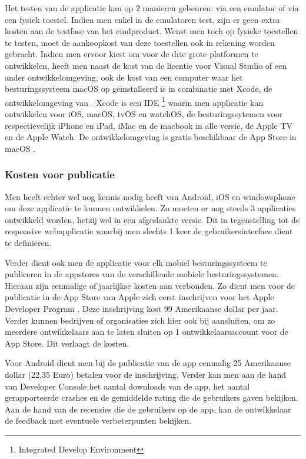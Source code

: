 Het testen van de applicatie kan op 2 manieren gebeuren: via een emulator of via een fysiek toestel. Indien men enkel in de emulatoren test, zijn er geen extra kosten aan de testfase van het eindproduct.
Wenst men toch op fysieke toestellen te testen, moet de aankoopkost van deze toestellen ook in rekening worden gebracht.
\newpage
Indien men ervoor kiest om voor de drie grote platformen te ontwikkelen, heeft men naast de kost van de licentie voor Visual Studio of een ander ontwikkelomgeving,
ook de kost van een computer waar het besturingssysteem macOS op geïnstalleerd is in combinatie met Xcode, de ontwikkelomgeving van \cite{xcodemacappstore2017}.
Xcode is een IDE \footnote{Integrated Develop Environment} waarin men applicatie kan ontwikkelen voor iOS, macOS, tvOS en watchOS, de besturingssytemen voor respectievelijk iPhone en iPad,
iMac en de macbook in alle versie, de Apple TV en de Apple Watch. De ontwikkelomgeving is gratis beschikbaar de App Store in macOS .

\subsubsection{Kosten voor publicatie}
Men heeft echter wel nog kennis nodig heeft van Android, iOS en windowsphone om deze applicatie te
kunnen ontwikkelen. Zo moeten er nog steeds 3 applicaties ontwikkeld worden, hetzij wel in een afgeslankte versie.
Dit in tegenstelling tot de responsive webapplicatie waarbij men slechts 1 keer de gebruikersinterface dient te definiëren.

Verder dient ook men de applicatie voor elk mobiel besturingssysteem te publiceren in de appstores van de verschillende
mobiele besturingssystemen. Hieraan zijn  eenmalige of jaarlijkse kosten aan verbonden. Zo dient men voor de publicatie in de App Store van Apple zich eerst inschrijven voor het
Apple Developer Program \citep{appledeveloperprograms2017} . Deze inschrijving kost 99 Amerikaanse dollar per jaar. Verder kunnen bedrijven of organisaties
zich hier ook bij aansluiten, om zo meerdere ontwikkelaars aan te laten sluiten op 1 ontwikkelaarsaccount voor de App Store.
Dit verlaagt de kosten.

Voor Android dient men bij de publicatie van de app \citep{getstartedwithpublishingandroiddevelopers2017} eenmalig 25 Amerikaanse dollar (22,35 Euro) betalen voor de inschrijving.
Verder kan men aan de hand van Developer Console het aantal downloads van de app, het aantal gerapporteerde crashes en de gemiddelde rating die de gebruikers gaven bekijken.
Aan de hand van de recensies die de gebruikers op de app, kan de ontwikkelaar de feedback met eventuele verbeterpunten bekijken.

